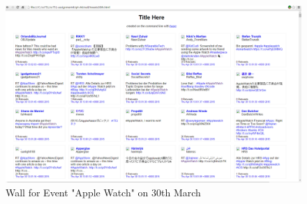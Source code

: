 \documentclass[12pt]{Report}
\begin{document}
\begin{figure}[ht]    
    \begin{center}
        \includegraphics[scale=0.60]{wall30th.png}
        \caption{Wall for Event "Apple Watch" on 30th March }
        \label{Wall for Event "Apple Watch" on 30th March}
    \end{center}
\end{figure}



\nocite{*}
\end{document}
